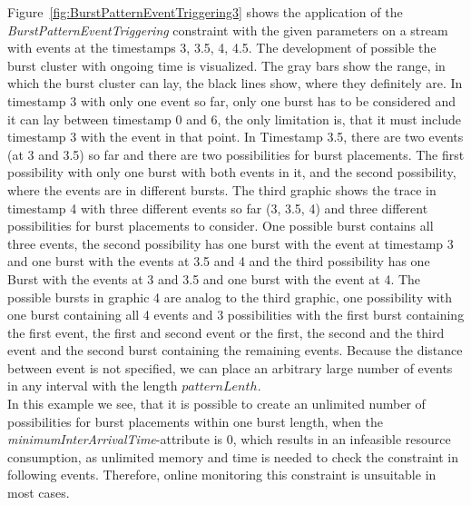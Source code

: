 Figure~\ref{fig:BurstPatternEventTriggering3} shows the application of the \emph{BurstPatternEventTriggering} constraint with the given parameters on a stream with events at the timestamps 3, 3.5, 4, 4.5. The development of possible the burst cluster with ongoing time is visualized. The gray bars show the range, in which the burst cluster can lay, the black lines show, where they definitely are. In timestamp 3 with only one event so far, only one burst has to be considered and it can lay between timestamp 0 and 6, the only limitation is, that it must include timestamp 3 with the event in that point. In Timestamp 3.5, there are two events (at 3 and 3.5) so far and there are two possibilities for burst placements. The first possibility with only one burst with both events in it, and the second possibility, where the events are in different bursts. The third graphic shows the trace in timestamp 4 with three different events so far (3, 3.5, 4) and three different possibilities for burst placements to consider. One possible burst contains all three events, the second possibility has one burst with the event at timestamp 3 and one burst with the events at 3.5 and 4 and the third possibility has one Burst with the events at 3 and 3.5 and one burst with the event at 4. The possible bursts in graphic 4 are analog to the third graphic, one possibility with one burst containing all 4 events and 3 possibilities with the first burst containing the first event, the first and second event or the first, the second and the third event and the second burst containing the remaining events. Because the distance between event is not specified, we can place an arbitrary large number of events in any interval with the length $patternLenth$.\\
In this example we see, that it is possible to create an unlimited number of possibilities for burst placements within one burst length, when the \textit{minimumInterArrivalTime}-attribute is 0, which results in an infeasible resource consumption, as unlimited memory and time is needed to check the constraint in following events. Therefore, online monitoring this constraint is unsuitable in most cases.

